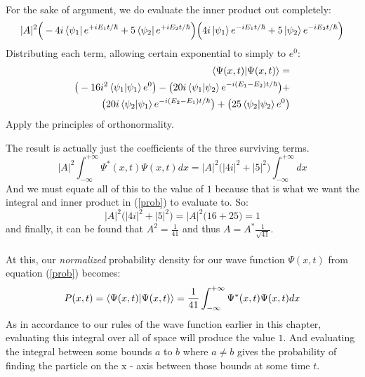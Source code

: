 \documentclass[12pt,letterpaper]{book}
\begin{document}
\paragraph*{}For the sake of argument, we do evaluate the inner product out completely:
\begin{equation}
|A|^2
\Big( - 4i \bra{\psi_1}e^{+iE_1t/\hbar} + 5 \bra{\psi_2} e^{+iE_2t/\hbar} \Big)
\Big( 4i \ket{\psi_1}e^{-iE_1t/\hbar} + 5 \ket{\psi_2} e^{-iE_2t/\hbar} \Big)
\end{equation}
Distributing each term, allowing certain exponential to simply to $e^0$:
\begin{equation}
\begin{split}
\braket{\Psi(x,t)}{\Psi(x,t)} = & \\
\big( -16i^2 \braket{\psi_1}{\psi_1} e^0 \big) - \big( 20i \braket{\psi_1}{\psi_2}e^{-i(E_1 - E_2)t/\hbar} \big) + & \\
\big(20i   \braket{\psi_2}{\psi_1} e^{-i(E_2 - E_1)t/\hbar} \big) +  \big( 25\braket{\psi_2}{\psi_2} e^0 \big)
\end{split}
\end{equation}
Apply the principles of orthonormality.

The result is actually just the coefficients of the three surviving terms.
\begin{equation}
|A|^2 \int_{-\infty}^{+\infty} \Psi^*(x,t)\Psi(x,t) dx = |A|^2 \Big(|4i|^2 + |5|^2 \Big) \int_{-\infty}^{+\infty}dx
\end{equation}
And we must equate all of this to the value of $1$ because that is what we want the integral and inner product in (\ref{prob}) to evaluate to. So:
\begin{equation}
|A|^2 \Big(|4i|^2 + |5|^2 \Big) = |A|^2 \Big(16 + 25 \Big) = 1
\end{equation}
and finally, it can be found that $A^2 = \frac{1}{41}$ and thus $A = A^* \frac{1}{\sqrt{41}}$.
\paragraph*{}At this, our \textit{normalized} probability density for our wave function $\Psi(x,t)$ from equation (\ref{prob}) becomes:
\begin{equation}
P(x,t) = \braket{\Psi(x,t)}{\Psi(x,t)} = \frac{1}{41}\int_{-\infty}^{+\infty} \Psi^*(x,t)\Psi(x,t) dx
\end{equation}
As in accordance to our rules of the wave function earlier in this chapter, evaluating this integral over all of space will produce the value $1$. And evaluating the integral between some bounds $a$ to $b$ where $a \neq  b$ gives the probability of finding the particle on the x - axis between those bounds at some time $t$.
\end{document}
